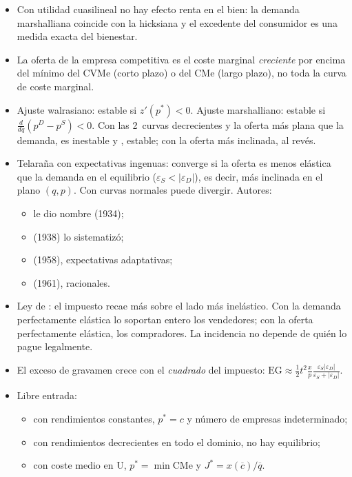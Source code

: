 \documentclass[11pt]{article}
\begin{document}
\begin{itemize}
\item Con utilidad cuasilineal no hay efecto renta en el bien: la demanda marshalliana coincide con la hicksiana y el excedente del consumidor es una medida exacta del bienestar.
\item La oferta de la empresa competitiva es el coste marginal \emph{creciente} por encima del mínimo del CVMe (corto plazo) o del CMe (largo plazo), no toda la curva de coste marginal.
\item Ajuste walrasiano: estable si $z'(p^*)<0$. Ajuste marshalliano: estable si $\frac{d}{dq}(p^D-p^S)<0$. Con las 2~curvas decrecientes y la oferta más plana que la demanda,  es inestable y , estable; con la oferta más inclinada, al revés.
\item Telaraña con expectativas ingenuas: converge si la oferta es menos elástica que la demanda en el equilibrio ($\varepsilon_S<\lvert\varepsilon_D\rvert$), es decir, más inclinada en el plano $(q,p)$. Con curvas normales puede divergir. Autores:
  \begin{itemize}
  \item {} le dio nombre (1934);
  \item {} (1938) lo sistematizó;
  \item {} (1958), expectativas adaptativas;
  \item {} (1961), racionales.
  \end{itemize}
\item Ley de : el impuesto recae más sobre el lado más inelástico. Con la demanda perfectamente elástica lo soportan entero los vendedores; con la oferta perfectamente elástica, los compradores. La incidencia no depende de quién lo pague legalmente.
\item El exceso de gravamen crece con el \emph{cuadrado} del impuesto: $\mathrm{EG}\approx\tfrac12t^2\frac{x}{p}\frac{\varepsilon_S\lvert\varepsilon_D\rvert}{\varepsilon_S+\lvert\varepsilon_D\rvert}$.
\item Libre entrada:
  \begin{itemize}
  \item con rendimientos constantes, $p^*=c$ y número de empresas indeterminado;
  \item con rendimientos decrecientes en todo el dominio, no hay equilibrio;
  \item con coste medio en U, $p^*=\min\mathrm{CMe}$ y $J^*=x(\overline{c})/\overline{q}$.

\end{itemize}
\end{itemize}
\end{document}
